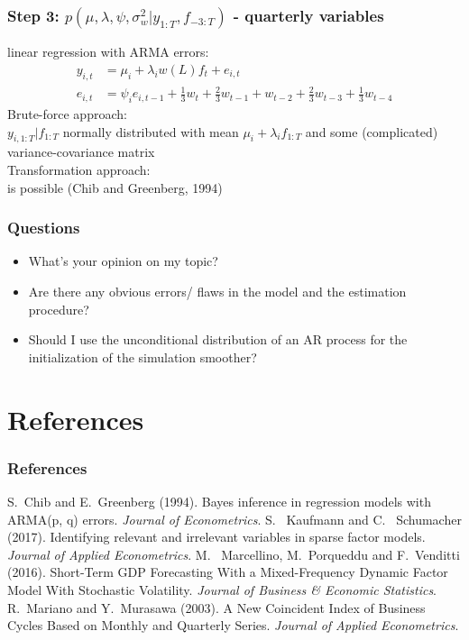 \documentclass{beamer}
\begin{document}
\begin{frame}
\frametitle{Step 3: $p(\mu, \lambda, \psi, \sigma_{w}^2|y_{1:T}, f_{-3:T})$ - quarterly variables}
linear regression with ARMA errors:\\
\begin{align}
y_{i,t} &= \mu_i + \lambda_i w(L)f_t + e_{i,t} \\
e_{i,t} &= \psi_i e_{i,t-1} + \frac{1}{3}w_t + \frac{2}{3}w_{t-1} + w_{t-2} + \frac{2}{3}w_{t-3} + \frac{1}{3}w_{t-4}
\end{align}
Brute-force approach:\\
$y_{i,1:T}|f_{1:T}$ normally distributed with mean $\mu_i + \lambda_i f_{1:T}$ and some (complicated) variance-covariance matrix\\
\vspace{0.5cm}
Transformation approach:\\
is possible (Chib and Greenberg, 1994)
\end{frame}

\begin{frame}
\frametitle{Questions}
\begin{itemize}
\item What's your opinion on my topic?
\item Are there any obvious errors/ flaws in the model and the estimation procedure?
\item Should I use the unconditional distribution of an AR process for the initialization of the simulation smoother?
\end{itemize}
\end{frame}

\section{References}

\begin{frame}
\frametitle{References}   
\begin{thebibliography}{9}
 S.~Chib and E.~Greenberg (1994). Bayes inference in regression models with ARMA(p, q) errors. \textit{Journal of Econometrics}.
 S.~ Kaufmann and C.~ Schumacher (2017). Identifying relevant and irrelevant variables in sparse factor models. \textit{Journal of Applied Econometrics}.
 M.~ Marcellino, M.~Porqueddu and F.~Venditti (2016). Short-Term GDP Forecasting With a Mixed-Frequency Dynamic Factor Model With Stochastic Volatility. \textit{Journal of Business \& Economic Statistics}.
 R.~Mariano and Y.~Murasawa (2003). A New Coincident Index of Business Cycles Based on Monthly and Quarterly Series. \textit{Journal of Applied Econometrics}.
\end{thebibliography}
\end{frame}
\end{document}
